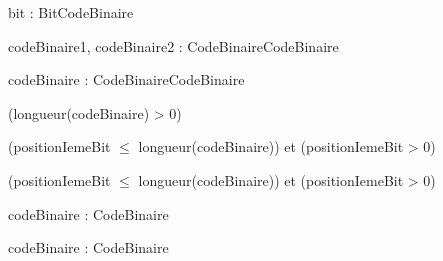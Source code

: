 \begin{algorithme}

    {bit : Bit}{CodeBinaire}

    {codeBinaire1, codeBinaire2 : CodeBinaire}{CodeBinaire}

    {}
    {}

    {codeBinaire : CodeBinaire}{CodeBinaire}

    {}
    {(longueur(codeBinaire) > 0)}

    {}

    {}
    {}
    {(positionIemeBit $\leq$ longueur(codeBinaire)) et (positionIemeBit > 0)}

    {}
    {}
    {(positionIemeBit $\leq$ longueur(codeBinaire)) et (positionIemeBit > 0)}

    {codeBinaire : CodeBinaire}{\naturelNonNul}

    {codeBinaire : CodeBinaire}{\booleenl}

\end{algorithme}